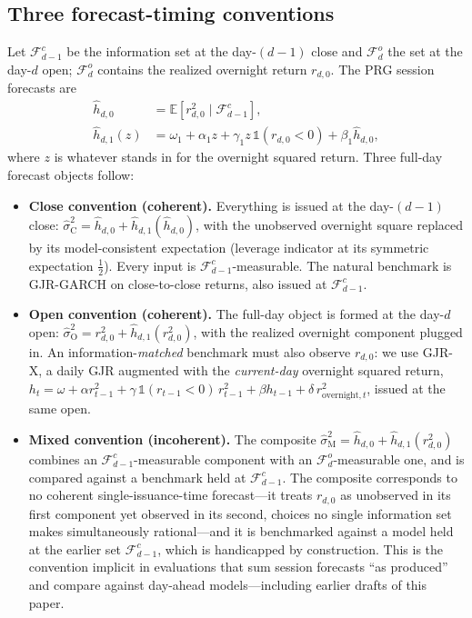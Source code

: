 \documentclass[11pt,a4paper]{article}
\begin{document}
\subsection{Three forecast-timing conventions}
\label{sec:conventions}

Let $\mathcal{F}^{c}_{d-1}$ be the information set at the day-$(d-1)$ close and $\mathcal{F}^{o}_{d}$ the set at the day-$d$ open; $\mathcal{F}^{o}_{d}$ contains the realized overnight return $r_{d,0}$. The PRG session forecasts are
\begin{align}
    \hat{h}_{d,0} &= \mathbb{E}\!\left[r^2_{d,0} \mid \mathcal{F}^{c}_{d-1}\right],
    \label{eq:h_ov} \\
    \hat{h}_{d,1}(z) &= \omega_{1} + \alpha_{1} z + \gamma_{1} z\,\mathbb{1}(r_{d,0}<0) + \beta_{1} \hat{h}_{d,0},
    \label{eq:h_in}
\end{align}
where $z$ is whatever stands in for the overnight squared return. Three full-day forecast objects follow:

\begin{itemize}
\item \textbf{Close convention (coherent).} Everything is issued at the day-$(d-1)$ close: $\hat{\sigma}^2_{\text{C}} = \hat{h}_{d,0} + \hat{h}_{d,1}(\hat{h}_{d,0})$, with the unobserved overnight square replaced by its model-consistent expectation (leverage indicator at its symmetric expectation $\tfrac12$). Every input is $\mathcal{F}^{c}_{d-1}$-measurable. The natural benchmark is GJR-GARCH \citep{Glosten1993} on close-to-close returns, also issued at $\mathcal{F}^{c}_{d-1}$.
\item \textbf{Open convention (coherent).} The full-day object is formed at the day-$d$ open: $\hat{\sigma}^2_{\text{O}} = r^2_{d,0} + \hat{h}_{d,1}(r^2_{d,0})$, with the realized overnight component plugged in. An information-\emph{matched} benchmark must also observe $r_{d,0}$: we use GJR-X, a daily GJR augmented with the \emph{current-day} overnight squared return,
$h_t = \omega + \alpha r^2_{t-1} + \gamma\,\mathbb{1}(r_{t-1}<0)\,r^2_{t-1} + \beta h_{t-1} + \delta\, r^2_{\text{overnight},t}$,
issued at the same open.
\item \textbf{Mixed convention (incoherent).} The composite $\hat{\sigma}^2_{\text{M}} = \hat{h}_{d,0} + \hat{h}_{d,1}(r^2_{d,0})$ combines an $\mathcal{F}^{c}_{d-1}$-measurable component with an $\mathcal{F}^{o}_{d}$-measurable one, and is compared against a benchmark held at $\mathcal{F}^{c}_{d-1}$. The composite corresponds to no coherent single-issuance-time forecast---it treats $r_{d,0}$ as unobserved in its first component yet observed in its second, choices no single information set makes simultaneously rational---and it is benchmarked against a model held at the earlier set $\mathcal{F}^{c}_{d-1}$, which is handicapped by construction. This is the convention implicit in evaluations that sum session forecasts ``as produced'' and compare against day-ahead models---including earlier drafts of this paper.
\end{itemize}
\end{document}
